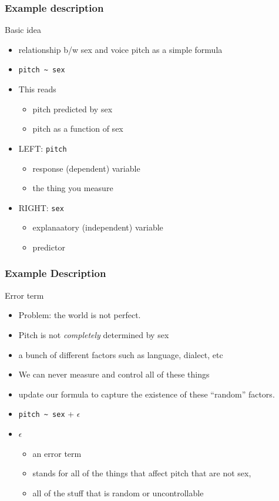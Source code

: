 \documentclass[10p]{beamer}\usepackage[]{graphicx}\usepackage[]{color}
\begin{document}
\begin{frame}[fragile]
\frametitle{Example description}
Basic idea
\begin{itemize}
\item relationship b/w sex and voice pitch as a simple formula
\item \verb|pitch ~ sex|
\item This reads
	\begin{itemize}
	\item pitch predicted by sex
	\item pitch as a function of sex
	\end{itemize}
\item LEFT: \texttt{pitch}
	\begin{itemize}
	\item response (dependent) variable
	\item the thing you measure
	\end{itemize}
\item RIGHT: \texttt{sex}
	\begin{itemize}
	\item explanaatory (independent) variable
	\item predictor
	\end{itemize}
\end{itemize}
\end{frame}

\begin{frame}[fragile]
\frametitle{Example Description}
Error term
\begin{itemize}
\item Problem: the world is not perfect.
\item Pitch is not \textit{completely} determined by sex
\item a bunch of different factors such as language, dialect, etc
\item We can never measure and control all of these things
\item update our formula to capture the existence of these ``random'' factors.
\item \verb|pitch ~ sex| + $\epsilon$ 
\item $\epsilon$
	\begin{itemize}
	\item an error term
	\item stands for all of the things that affect pitch that are not sex,
	\item all of the stuff that is random or uncontrollable
	\end{itemize}
\end{itemize}

\end{frame}
\end{document}
